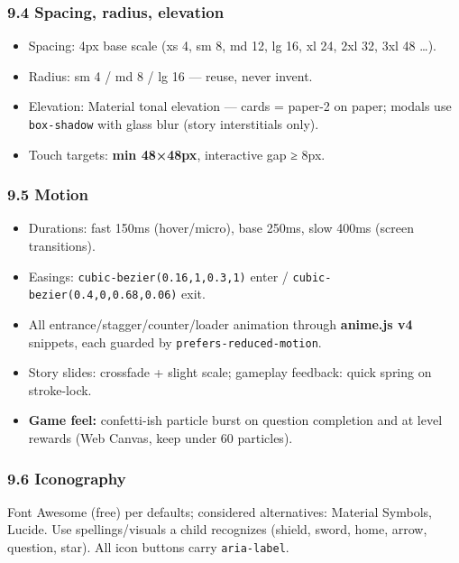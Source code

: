 \documentclass[
  11pt,
]{article}
\providecommand{\tightlist}{%
  \setlength{\itemsep}{0pt}\setlength{\parskip}{0pt}}
\begin{document}
\subsubsection{9.4 Spacing, radius,
elevation}\label{spacing-radius-elevation}

\begin{itemize}
\tightlist
\item
  Spacing: 4px base scale (xs 4, sm 8, md 12, lg 16, xl 24, 2xl 32, 3xl
  48 \ldots).
\item
  Radius: sm 4 / md 8 / lg 16 --- reuse, never invent.
\item
  Elevation: Material tonal elevation --- cards = paper-2 on paper;
  modals use \texttt{box-shadow} with glass blur (story interstitials
  only).
\item
  Touch targets: \textbf{min 48×48px}, interactive gap ≥ 8px.
\end{itemize}

\subsubsection{9.5 Motion}\label{motion}

\begin{itemize}
\tightlist
\item
  Durations: fast 150ms (hover/micro), base 250ms, slow 400ms (screen
  transitions).
\item
  Easings: \texttt{cubic-bezier(0.16,1,0.3,1)} enter /
  \texttt{cubic-bezier(0.4,0,0.68,0.06)} exit.
\item
  All entrance/stagger/counter/loader animation through \textbf{anime.js
  v4} snippets, each guarded by \texttt{prefers-reduced-motion}.
\item
  Story slides: crossfade + slight scale; gameplay feedback: quick
  spring on stroke-lock.
\item
  \textbf{Game feel:} confetti-ish particle burst on question completion
  and at level rewards (Web Canvas, keep under 60 particles).
\end{itemize}

\subsubsection{9.6 Iconography}\label{iconography}

Font Awesome (free) per defaults; considered alternatives: Material
Symbols, Lucide. Use spellings/visuals a child recognizes (shield,
sword, home, arrow, question, star). All icon buttons carry
\texttt{aria-label}.
\end{document}

